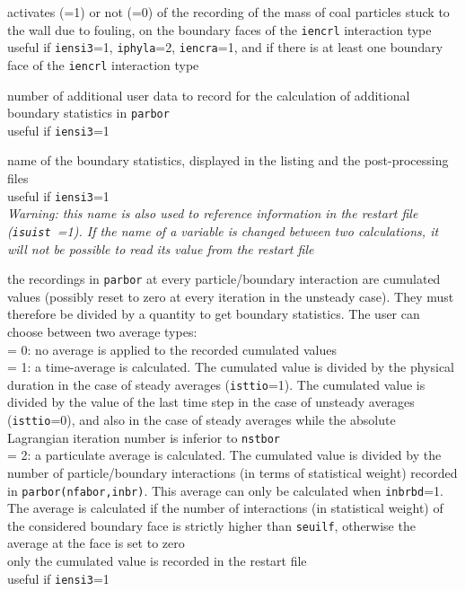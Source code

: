 {activates (=1) or not (=0) of the recording of the mass of coal particles
stuck to the wall due to fouling, on the boundary faces of the \texttt{iencrl}
interaction type\\
useful if \texttt{iensi3}=1, \texttt{iphyla}=2, \texttt{iencra}=1, and if
there is at least one boundary face of the \texttt{iencrl} interaction
type}

{number of additional user data to record for the calculation
of additional boundary statistics in \texttt{parbor}\\
useful if \texttt{iensi3}=1}

{name of the boundary statistics, displayed in the listing
and the post-processing files\\
useful if \texttt{iensi3}=1\\
{\em Warning: this name is also used to reference information in the restart file
\mbox{(\texttt{isuist} =1)}. If the name of a variable is changed between two
calculations, it will not be possible to read its value from the restart file}}

{the recordings in \texttt{parbor} at every particle/boundary interaction are
cumulated values (possibly reset to zero at every iteration in the
unsteady case). They must therefore be divided by a quantity to
get boundary statistics. The user can choose between two average types:\\
\hspace*{1.3cm} = 0: no average is applied to the recorded cumulated values\\
\hspace*{1.3cm} = 1: a time-average is calculated. The cumulated value
is divided by the physical duration in the case of steady
averages (\texttt{isttio}=1). The cumulated value is divided by the value of
the last time step in the case of unsteady averages (\texttt{isttio}=0),
and also in the case of steady averages while the
absolute Lagrangian iteration number is inferior to \texttt{nstbor}\\
\hspace*{1.3cm} = 2: a particulate average is calculated. The cumulated
value is divided by the number of particle/boundary interactions (in terms of
statistical weight) recorded in \texttt{parbor(nfabor,inbr)}. This average
can only be calculated when \texttt{inbrbd}=1. The average is calculated if
the number of interactions (in statistical weight) of the considered
boundary face is strictly higher than \texttt{seuilf}, otherwise the average
at the face is set to zero\\
only the cumulated value is recorded in the restart file\\
useful if \texttt{iensi3}=1}

